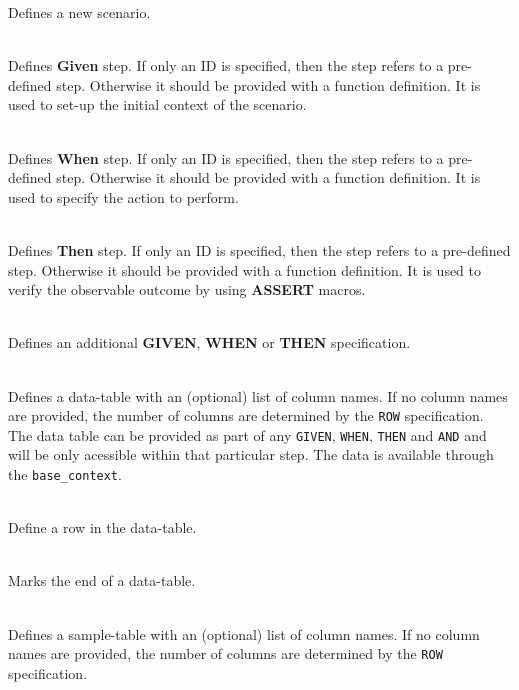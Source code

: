 \documentclass[10pt,a4paper,openany]{mudbook}
\makeatletter
\newcommand{\indextt}[2][]{\texttt{#2}\index{#2@\texttt{#2}#1}}
\makeatother
\begin{document}
\begin{description}
        Defines a new scenario.
  \item[\indextt{GIVEN(...)}] \hfill  \\
        Defines \textbf{Given} step. If only an ID is specified, then the step
        refers to a pre-defined step. Otherwise it should be provided with a
        function definition. It is used to set-up the initial context of the
        scenario.
  \item[\indextt{WHEN(...)}] \hfill  \\
        Defines \textbf{When} step. If only an ID is specified, then the step
        refers to a pre-defined step. Otherwise it should be provided with a
        function definition. It is used to specify the action to perform.
  \item[\indextt{THEN(...)}] \hfill  \\
        Defines \textbf{Then} step. If only an ID is specified, then the step
        refers to a pre-defined step. Otherwise it should be provided with a
        function definition. It is used to verify the observable outcome by
        using \textbf{ASSERT} macros.
  \item[\indextt{AND(...)}] \hfill  \\
        Defines an additional \textbf{GIVEN}, \textbf{WHEN} or \textbf{THEN}
        specification.
  \item[\indextt{DATA(...)}] \hfill  \\
        Defines a data-table with an (optional) list of column names. If no
        column names are provided, the number of columns are determined by
        the \texttt{ROW} specification. \hfill  \\
        The data table can be provided as part of any \texttt{GIVEN},
        \texttt{WHEN}, \texttt{THEN} and \texttt{AND} and will be only
        acessible within that particular step. The data is available through
        the \indextt{base\_context}.
  \item[\indextt{DATA\_ROW(...)}] \hfill  \\
        Define a row in the data-table.
  \item[\indextt{END\_DATA()}] \hfill  \\
        Marks the end of a data-table.
  \item[\indextt{SAMPLES}] \hfill  \\
        Defines a sample-table with an (optional) list of column names. If no
        column names are provided, the number of columns are determined by
        the \texttt{ROW} specification. \hfill  \\

\end{description}
\end{document}

